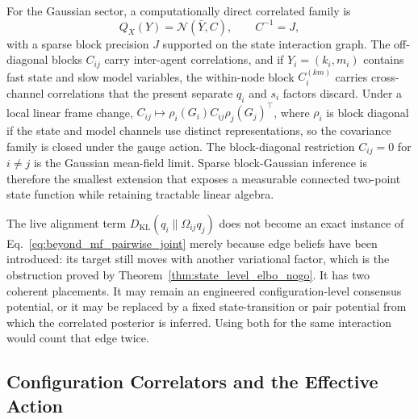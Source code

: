 \documentclass[11pt]{article}
\begin{document}
For the Gaussian sector, a computationally direct correlated family is
\begin{equation}
Q_X(Y)=\mathcal{N}(\bar{Y},C),
\qquad
C^{-1}=J,
\label{eq:beyond_mf_block_gaussian}
\end{equation}
with a sparse block precision $J$ supported on the state interaction graph. The off-diagonal blocks $C_{ij}$ carry inter-agent correlations, and if $Y_i=(k_i,m_i)$ contains fast state and slow model variables, the within-node block $C_i^{(km)}$ carries cross-channel correlations that the present separate $q_i$ and $s_i$ factors discard. Under a local linear frame change, $C_{ij}\mapsto \rho_i(G_i)C_{ij}\rho_j(G_j)^\top$, where $\rho_i$ is block diagonal if the state and model channels use distinct representations, so the covariance family is closed under the gauge action. The block-diagonal restriction $C_{ij}=0$ for $i\ne j$ is the Gaussian mean-field limit. Sparse block-Gaussian inference is therefore the smallest extension that exposes a measurable connected two-point state function while retaining tractable linear algebra.

The live alignment term $D_{\mathrm{KL}}(q_i\|\Omega_{ij}q_j)$ does not become an exact instance of Eq.~\eqref{eq:beyond_mf_pairwise_joint} merely because edge beliefs have been introduced: its target still moves with another variational factor, which is the obstruction proved by Theorem~\ref{thm:state_level_elbo_nogo}. It has two coherent placements. It may remain an engineered configuration-level consensus potential, or it may be replaced by a fixed state-transition or pair potential from which the correlated posterior is inferred. Using both for the same interaction would count that edge twice.

\subsection{Configuration Correlators and the Effective Action}
\end{document}
